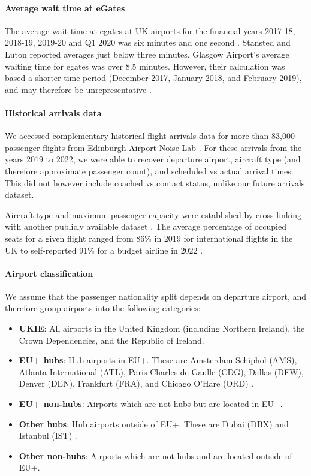 \documentclass[10pt]{article}
\begin{document}
\paragraph{Average wait time at eGates}
The average wait time at \glspl{egate} at UK airports for the financial years 2017-18, 2018-19, 2019-20 and Q1 2020 was six minutes and one second \cite{Inspection_eGates}. Stansted and Luton reported averages just below three minutes. Glasgow Airport's average waiting time for \glspl{egate} was over 8.5 minutes. However, their calculation was based a shorter time period (December 2017, January 2018, and February 2019), and may therefore be unrepresentative \cite{Inspection_eGates}.


\paragraph{Historical arrivals data}
We accessed complementary historical flight arrivals data for more than 83,000 passenger flights from Edinburgh Airport Noise Lab \cite{noise_lab}. For these arrivals from the years 2019 to 2022, we were able to recover departure airport, aircraft type (and therefore approximate passenger count), and scheduled vs actual arrival times. This did not however include coached vs contact status, unlike our future arrivals dataset. 

% 

Aircraft type and maximum passenger capacity were established by cross-linking with another publicly available dataset \cite{aircraft_capacity}. The average percentage of occupied seats for a given flight ranged from 86\% in 2019 for international flights in the UK \cite{loading_factor_national} to self-reported 91\% for a budget airline in 2022 \cite{loading_factor_ryanair}.

\paragraph{Airport classification}
We assume that the passenger nationality split depends on departure airport, and therefore group airports into the following categories: 
\begin{itemize}
    \item \textbf{UKIE}: All airports in the United Kingdom (including Northern Ireland), the Crown Dependencies, and the Republic of Ireland.
    \item \textbf{EU+ hubs}: Hub airports in EU+. These are Amsterdam Schiphol (AMS), Atlanta International (ATL), Paris Charles de Gaulle (CDG), Dallas (DFW), Denver (DEN), Frankfurt (FRA), and Chicago O'Hare (ORD) \cite{mega_hubs}.
    \item \textbf{EU+ non-hubs}: Airports which are not hubs but are located in EU+.
    \item \textbf{Other hubs}: Hub airports outside of EU+. These are Dubai (DBX) and Istanbul (IST) \cite{mega_hubs}.
    \item \textbf{Other non-hubs}: Airports which are not hubs and are located outside of EU+.
\end{itemize}
\end{document}
